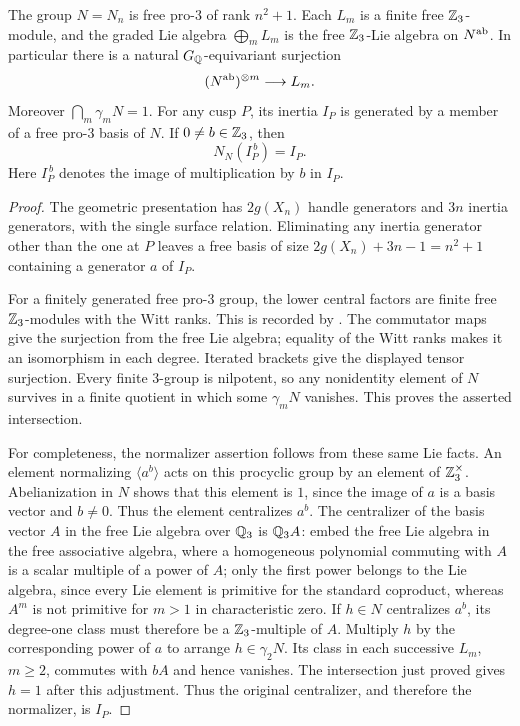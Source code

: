\begin{lemma}
\label{lem:lm-free-central}
The group $N=N_n$ is free pro-$3$ of rank $n^2+1$.  Each $L_m$ is a finite free
$\mathbb Z_3$-module, and the graded Lie algebra $\bigoplus_mL_m$ is the free
$\mathbb Z_3$-Lie algebra on $N^{\rm ab}$.  In particular there is a natural
$G_\mathbb Q$-equivariant surjection
\[
 (N^{\rm ab})^{\otimes m}\longrightarrow L_m.
\]
Moreover $\bigcap_m\gamma_mN=1$.
For any cusp $P$, its inertia $I_P$ is generated by a member of a free
pro-$3$ basis of $N$.  If $0\ne b\in\mathbb Z_3$, then
\[
 N_N(I_P^{\,b})=I_P.
\]
Here $I_P^{\,b}$ denotes the image of multiplication by $b$ in $I_P$.
\end{lemma}
\begin{proof}
The geometric presentation has $2g(X_n)$ handle generators and $3n$
inertia generators, with the single surface relation.  Eliminating any
inertia generator other than the one at $P$ leaves a free basis of size
$2g(X_n)+3n-1=n^2+1$ containing a generator $a$ of $I_P$.

For a finitely generated free pro-$3$ group, the lower central factors
are finite free $\mathbb Z_3$-modules with the Witt ranks.  This is recorded by
\citet[\S3.5, p.~71, immediately after Theorem 3.5.1]{LubotzkySegal2002}.  The commutator maps give the
surjection from the free Lie algebra; equality of the Witt ranks makes
it an isomorphism in each degree.  Iterated brackets give the displayed
tensor surjection.  Every finite $3$-group is nilpotent, so any nonidentity
element of $N$ survives in a finite quotient in which some $\gamma_mN$
vanishes.  This proves the asserted intersection.

For completeness, the normalizer assertion follows from these same Lie
facts.  An element normalizing $\langle a^b\rangle$ acts on this
procyclic group by an element of $\mathbb Z_3^\times$.  Abelianization in $N$
shows that this element is $1$, since the image of $a$ is a basis vector
and $b\ne0$.  Thus the element centralizes $a^b$.
The centralizer of the basis vector $A$ in the free Lie algebra over
$\mathbb Q_3$ is $\mathbb Q_3A$: embed the free Lie algebra in the free associative
algebra, where a homogeneous polynomial commuting with $A$ is a scalar
multiple of a power of $A$; only the first power belongs to the Lie
algebra, since every Lie element is primitive for the standard
coproduct, whereas $A^m$ is not primitive for $m>1$ in characteristic zero.  If $h\in N$ centralizes $a^b$, its degree-one class must
therefore be a $\mathbb Z_3$-multiple of $A$.  Multiply $h$ by the corresponding
power of $a$ to arrange $h\in\gamma_2N$.  Its class in each successive
$L_m$, $m\ge2$, commutes with $bA$ and hence vanishes.  The intersection
just proved gives $h=1$ after this adjustment.  Thus the original
centralizer, and therefore the normalizer, is $I_P$.
\end{proof}

